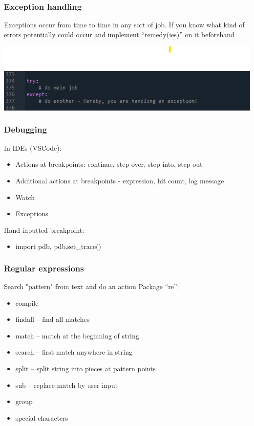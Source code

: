 \documentclass{beamer}
\begin{document}
\begin{frame}
    \frametitle{Exception handling}
    Exceptions occur from time to time in any sort of job. 
    If you know what kind of errors potentially could occur
    and implement “remedy(ies)” on it beforehand
        \begin{center}
            \includegraphics[scale=0.5]{figures/exception.jpg}
        \end{center}
\end{frame}

\begin{frame}
    \frametitle{Debugging}

In IDEs (VSCode):

    \begin{itemize}
        \item Actions at breakpoints: continue, step over, step into, step out
        \item Additional actions at breakpoints - expression, hit count, log message
        \item Watch
        \item Exceptions
    \end{itemize}

\vskip 2mm

Hand inputted breakpoint:

    \begin{itemize}
        \item import pdb, pdb.set\_trace()
    \end{itemize}
\end{frame}

\begin{frame}
    \frametitle{Regular expressions}
Search "pattern"  from text and do an action
Package “re”:
    \begin{itemize}
        \item compile
        \item findall – find all matches
        \item match – match at the beginning of string
        \item search – first match anywhere in string
        \item split – split string into pieces at pattern points
        \item sub – replace match by user input
        \item group 
        \item special characters
    \end{itemize}
\end{frame}
\end{document}
